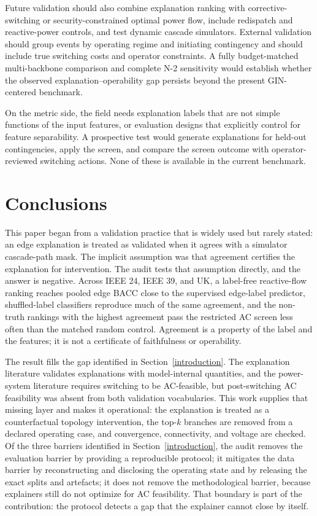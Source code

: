 Future validation should also combine explanation ranking with corrective-switching or security-constrained optimal power flow, include redispatch and reactive-power controls, and test dynamic cascade simulators. External validation should group events by operating regime and initiating contingency and should include true switching costs and operator constraints. A fully budget-matched multi-backbone comparison and complete N-2 sensitivity would establish whether the observed explanation--operability gap persists beyond the present GIN-centered benchmark.

On the metric side, the field needs explanation labels that are not simple functions of the input features, or evaluation designs that explicitly control for feature separability. A prospective test would generate explanations for held-out contingencies, apply the screen, and compare the screen outcome with operator-reviewed switching actions. None of these is available in the current benchmark.

\section{Conclusions}\label{conclusions}

This paper began from a validation practice that is widely used but rarely stated: an edge explanation is treated as validated when it agrees with a simulator cascade-path mask. The implicit assumption was that agreement certifies the explanation for intervention. The audit tests that assumption directly, and the answer is negative. Across IEEE 24, IEEE 39, and UK, a label-free reactive-flow ranking reaches pooled edge BACC close to the supervised edge-label predictor, shuffled-label classifiers reproduce much of the same agreement, and the non-truth rankings with the highest agreement pass the restricted AC screen less often than the matched random control. Agreement is a property of the label and the features; it is not a certificate of faithfulness or operability.

The result fills the gap identified in Section~\ref{introduction}. The explanation literature validates explanations with model-internal quantities, and the power-system literature requires switching to be AC-feasible, but post-switching AC feasibility was absent from both validation vocabularies. This work supplies that missing layer and makes it operational: the explanation is treated as a counterfactual topology intervention, the top-$k$ branches are removed from a declared operating case, and convergence, connectivity, and voltage are checked. Of the three barriers identified in Section~\ref{introduction}, the audit removes the evaluation barrier by providing a reproducible protocol; it mitigates the data barrier by reconstructing and disclosing the operating state and by releasing the exact splits and artefacts; it does not remove the methodological barrier, because explainers still do not optimize for AC feasibility. That boundary is part of the contribution: the protocol detects a gap that the explainer cannot close by itself.

